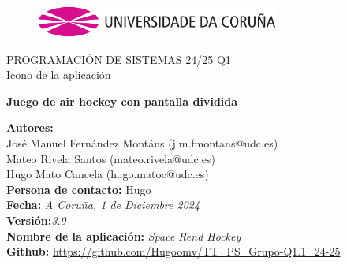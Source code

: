 \documentclass[a4paper,openright,12pt]{article}
\begin{document}
\begin{titlepage}

\begin{center}
\vspace*{-1in}
\begin{figure}[htb]
\begin{center}
\includegraphics[width=8cm]{udc.eps}
\end{center}
\end{figure}

\vspace*{1in}
PROGRAMACIÓN DE SISTEMAS 24/25 Q1\\
Icono de la aplicación\\
\vspace*{1in}
\begin{Large}
\textbf{Juego de air hockey con pantalla dividida} \\
\end{Large}

\vspace*{3in}

\begin{large}
\raggedleft
\textbf{Autores:}\\ José Manuel Fernández Montáns (j.m.fmontans@udc.es) \\
Mateo Rivela Santos (mateo.rivela@udc.es)\\
Hugo Mato Cancela (hugo.matoc@udc.es)\\
\textbf{Persona de contacto:} Hugo\\
\textbf{Fecha:}\textit{ A Coruña, 1 de Diciembre 2024}\\
\textbf{Versión:}\textit{3.0}\\
\textbf{Nombre de la aplicación:} \textit{Space Rend Hockey}\\
\textbf{Github:} \url{https://github.com/Hugoomv/TT_PS_Grupo-Q1.1_24-25}\\
\end{large}

\end{center}
\end{titlepage} 

\newpage

\end{document}
